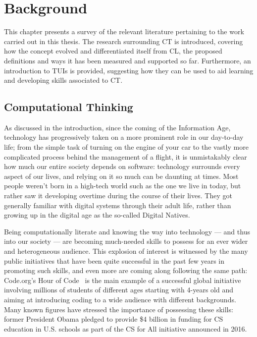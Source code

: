 %
\setcounter{chapter}{1}
\chapter{Background}\label{chap:background}


This chapter presents a survey of the relevant literature pertaining to the work carried out in this thesis. The research surrounding \ac{CT} is introduced, covering how the concept evolved and differentiated itself from \ac{CL}, the proposed definitions and ways it has been measured and supported so far. Furthermore, an introduction to \acp{TUI} is provided, suggesting how they can be used to aid learning and developing skills associated to \ac{CT}.

\section{Computational Thinking}
As discussed in the introduction, since the coming of the Information Age, technology has progressively taken on a more prominent role in our day-to-day life; from the simple task of turning on the engine of your car to the vastly more complicated process behind the management of a flight, it is unmistakably clear how much our entire society depends on software: technology surrounds every aspect of our lives, and relying on it so much can be daunting at times. Most people weren't born in a high-tech world such as the one we live in today, but rather saw it developing overtime during the course of their lives. They got generally familiar with digital systems through their adult life, rather than growing up in the digital age as the so-called Digital Natives.

Being computationally literate and knowing the way into technology --- and thus into our society --- are becoming much-needed skills to possess for an ever wider and heterogeneous audience. This explosion of interest is witnessed by the many public initiatives that have been quite successful in the past few years in promoting such skills, and even more are coming along following the same path: Code.org's Hour of Code~\cite{HOC} is the main example of a successful global initiative involving millions of students of different ages starting with 4-years old and aiming at introducing coding to a wide audience with different backgrounds. Many known figures have stressed the importance of possessing these skills: former President Obama pledged to provide \$4 billion in funding for \ac{CS} education in U.S. schools as part of the \ac{CS} for All initiative announced in 2016.

